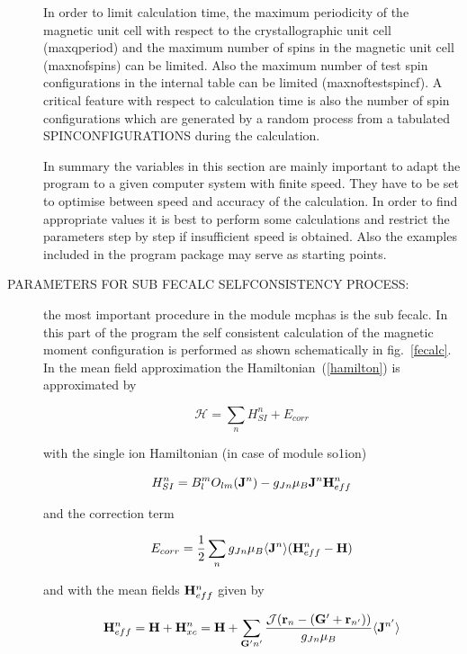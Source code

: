\begin{description}
In order to limit calculation time, the maximum periodicity
of the magnetic unit cell with respect to the crystallographic unit cell 
(maxqperiod) and the maximum number of spins in the magnetic unit cell 
(maxnofspins) can be limited. Also the maximum number of test spin configurations
in the internal table can be limited (maxnoftestspincf).
A critical feature with respect to calculation time is also the number of
spin configurations which are generated by a random process from a tabulated
SPINCONFIGURATIONS during the calculation. 

In summary the variables in this section are mainly important to adapt the
program to a given computer system with finite speed. They have to be set
to optimise between speed and accuracy of the calculation. In order to
find appropriate values it is best to perform some calculations 
and restrict the parameters step by step if insufficient speed is obtained.
Also the examples included in the program package may serve as starting
points.

\item [PARAMETERS FOR SUB FECALC SELFCONSISTENCY PROCESS:] the most important
procedure in the module {\prg mcphas} is the sub fecalc. In this part of the 
program the self consistent calculation of the magnetic moment configuration
is performed as shown schematically in fig.~\ref{fecalc}. 
In the mean field approximation the Hamiltonian~(\ref{hamilton}) is approximated
by

\begin{equation}
 {\mathcal H}=\sum_n H_{SI}^n + E_{corr}
\end{equation}

with the single ion Hamiltonian (in case of module {\prg so1ion})

\begin{equation}
H_{SI}^n=  B_l^m O_{lm}({\mathbf J}^n) 
	     - g_{Jn} \mu_B {\mathbf J}^n {\mathbf H^n_{eff}} 
\end{equation}

and the correction term

\begin{equation}
E_{corr}=\frac{1}{2}\sum_{n} g_{Jn} \mu_B \langle {\mathbf J}^n
 \rangle (\mathbf H^n_{eff}-\mathbf H) 
\end{equation}

and with the mean fields $ \mathbf H^n_{eff}$ given by

\begin{equation}\label{meanfield}
\mathbf H^n_{eff}=\mathbf H + \mathbf H^n_{xc}=\mathbf H+\sum_{{\mathbf G'}n'} \frac{{\mathcal J}
(\mathbf r_n-(\mathbf G'+\mathbf r_{n'}))}{g_{Jn}\mu_B } \langle{\mathbf J}^{n'}\rangle
\end{equation}


\end{description}
